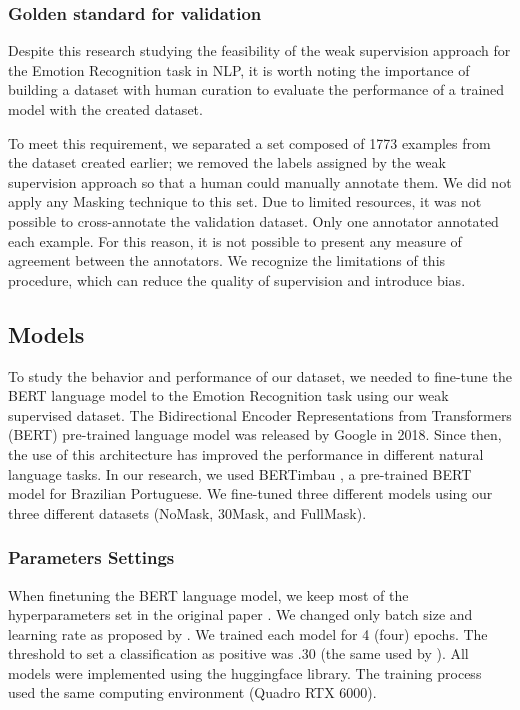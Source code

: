 \documentclass[12pt]{article}
\begin{document}
\subsubsection{Golden standard for validation}
Despite this research studying the feasibility of the weak supervision approach for the Emotion Recognition task in NLP, it is worth noting the importance of building a dataset with human curation to evaluate the performance of a trained model with the created dataset.

To meet this requirement, we separated a set composed of 1773 examples from the dataset created earlier; we removed the labels assigned by the weak supervision approach so that a human could manually annotate them. We did not apply any Masking technique to this set. Due to limited resources, it was not possible to cross-annotate the validation dataset. Only one annotator annotated each example. For this reason, it is not possible to present any measure of agreement between the annotators. We recognize the limitations of this procedure, which can reduce the quality of supervision and introduce bias.


\subsection{Models}

To study the behavior and performance of our dataset, we needed to fine-tune the BERT language model to the Emotion Recognition task using our weak supervised dataset. The Bidirectional Encoder Representations from Transformers (BERT) pre-trained language model \cite{Devlin2018} was released by Google in 2018. Since then, the use of this architecture has improved the performance in different natural language tasks. In our research, we used BERTimbau \cite{Bertimbau}, a pre-trained BERT model for Brazilian Portuguese. We fine-tuned three different models using our three different datasets (NoMask, 30Mask, and FullMask).


\subsubsection{Parameters Settings}
When finetuning the BERT language model, we keep most of the hyperparameters set in the original paper \cite{Devlin2018}. We changed only batch size and learning rate as proposed by \cite{Demszky2020}. We trained each model for 4 (four) epochs. The threshold to set a classification as positive was .30 (the same used by \cite{Demszky2020}). All models were implemented using the huggingface library. The training process used the same computing environment (Quadro RTX 6000).
\end{document}
